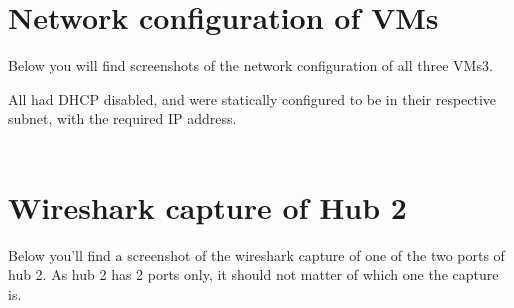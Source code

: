 \documentclass[a4paper]{scrreprt}
\begin{document}
\chapter{Network configuration of VMs}

Below you will find screenshots of the network configuration of all three VMs3.

All had DHCP disabled, and were statically configured to be in their respective
subnet, with the required IP address.
\\
\\
\noindent{}

\chapter{Wireshark capture of Hub 2}

Below you'll find a screenshot of the wireshark capture of one of the two ports
of hub 2. As hub 2 has 2 ports only, it should not matter of which one the
capture is.
\\
\\
\noindent{}
\end{document}
